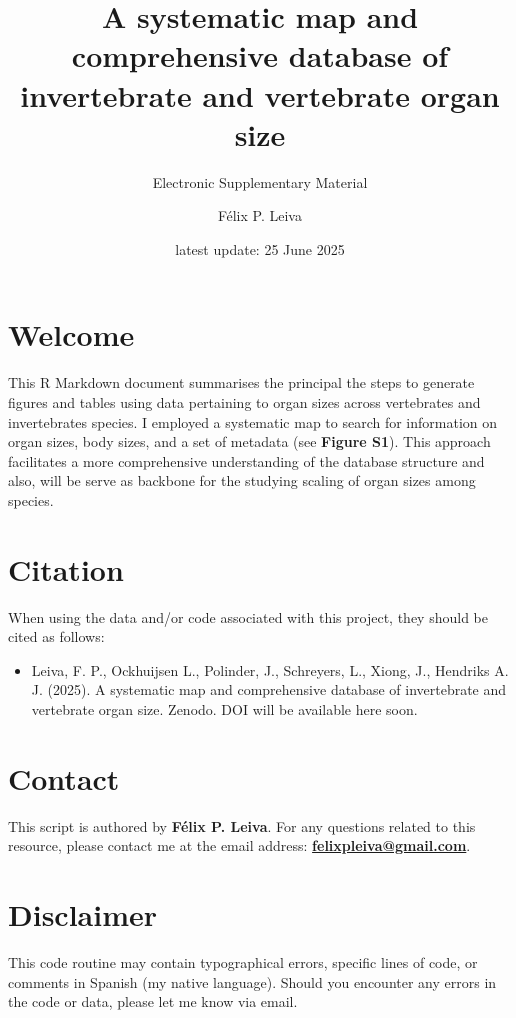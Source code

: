 \documentclass[
]{article}
\title{A systematic map and comprehensive database of invertebrate and vertebrate organ size}
\subtitle{Electronic Supplementary Material}
\author{Félix P. Leiva}
\date{latest update: 25 June 2025}
\providecommand{\tightlist}{%
  \setlength{\itemsep}{0pt}\setlength{\parskip}{0pt}}
\begin{document}
\maketitle

{
\setcounter{tocdepth}{6}
\tableofcontents
}
\section{Welcome}\label{welcome}

This R Markdown document summarises the principal the steps to generate figures and tables using data pertaining to organ sizes across vertebrates and invertebrates species. I employed a systematic map to search for information on organ sizes, body sizes, and a set of metadata (see \textbf{Figure S1}). This approach facilitates a more comprehensive understanding of the database structure and also, will be serve as backbone for the studying scaling of organ sizes among species.

\section{Citation}\label{citation}

When using the data and/or code associated with this project, they should be cited as follows:

\begin{itemize}
\tightlist
\item
  Leiva, F. P., Ockhuijsen L., Polinder, J., Schreyers, L., Xiong, J., Hendriks A. J. (2025). A systematic map and comprehensive database of invertebrate and vertebrate organ size. Zenodo. DOI will be available here soon.
\end{itemize}

\section{Contact}\label{contact}

This script is authored by \textbf{Félix P. Leiva}. For any questions related to this resource, please contact me at the email address: \href{mailto:felixpleiva@gmail.com}{\textbf{felixpleiva@gmail.com}}.

\section{Disclaimer}\label{disclaimer}

This code routine may contain typographical errors, specific lines of code, or comments in Spanish (my native language). Should you encounter any errors in the code or data, please let me know via email.
\end{document}
